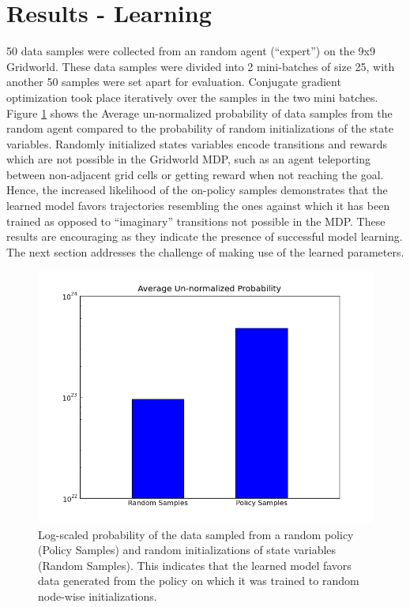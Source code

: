 \documentclass{article} %
\begin{document}
\section{Results - Learning}
50 data samples were collected from an random agent (``expert'') on the 9x9 Gridworld. These data samples were divided into 2 mini-batches of size 25, with another 50 samples were set apart for evaluation. Conjugate gradient optimization took place iteratively over the samples in the two mini batches. Figure \ref{fig:learning} shows the Average un-normalized probability of data samples from the random agent compared to the probability of random initializations of the state variables. Randomly initialized states variables encode transitions and rewards which are not possible in the Gridworld MDP, such as an agent teleporting between non-adjacent grid cells or getting reward when not reaching the goal. Hence, the increased likelihood of the on-policy samples demonstrates that the learned model favors trajectories resembling the ones against which it has been trained as opposed to ``imaginary'' transitions not possible in the MDP. These results are encouraging as they indicate the presence of successful model learning. The next section addresses the challenge of making use of the learned parameters.

\begin{figure}
  \centering
  \includegraphics[width=.7\textwidth]{figures/graph.png}
  \caption{Log-scaled probability of the data sampled from a random policy (Policy Samples) and random initializations of state variables (Random Samples). This indicates that the learned model favors data generated from the policy on which it was trained to random node-wise initializations.}
  \label{fig:learning}
\end{figure}
\end{document}
